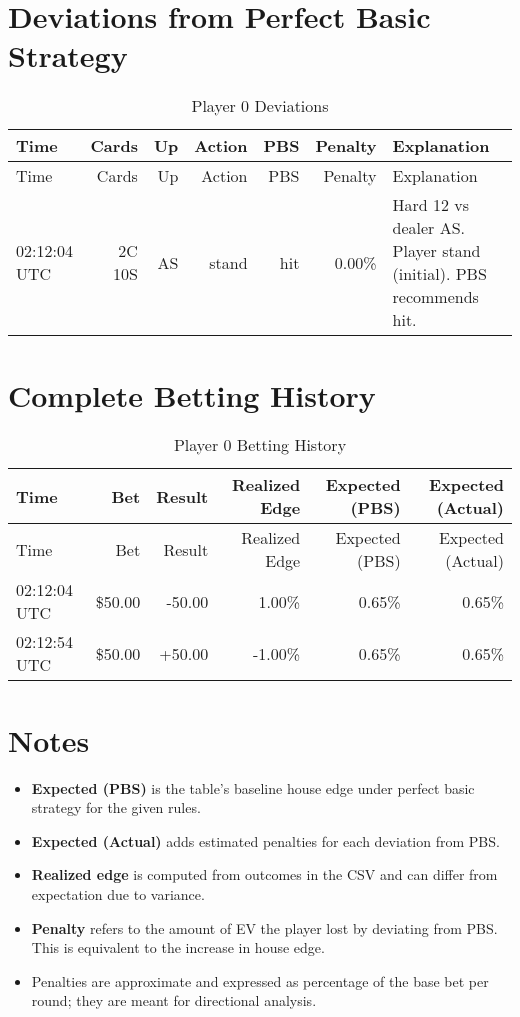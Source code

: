 \documentclass[11pt]{article}
\begin{document}
\section*{Deviations from Perfect Basic Strategy}
\begin{longtable}{l | r | r | r | r | r | p{5cm}}
\caption{Player 0 Deviations}\label{tab:devs_p0}\\
\hline
Time & Cards & Up & Action & PBS & Penalty & Explanation \\ \hline
\endfirsthead
\hline
Time & Cards & Up & Action & PBS & Penalty & Explanation \\ \hline
\endhead
02:12:04 UTC & 2C 10S & AS & stand & hit & 0.00\% & Hard 12 vs dealer AS. Player stand (initial). PBS recommends hit. \\
\hline
\end{longtable}
\section*{Complete Betting History}
\begin{longtable}{l | r | r | r | r | r}
\caption{Player 0 Betting History}\label{tab:history_p0}\\
\hline
Time & Bet & Result & Realized Edge & Expected (PBS) & Expected (Actual) \\ \hline
\endfirsthead
\hline
Time & Bet & Result & Realized Edge & Expected (PBS) & Expected (Actual) \\ \hline
\endhead
02:12:04 UTC & \$50.00 & -50.00 & 1.00\% & 0.65\% & 0.65\% \\
02:12:54 UTC & \$50.00 & +50.00 & -1.00\% & 0.65\% & 0.65\% \\
\hline
\end{longtable}

\section*{Notes}
\begin{itemize}
  \item \textbf{Expected (PBS)} is the table’s baseline house edge under perfect basic strategy for the given rules.
  \item \textbf{Expected (Actual)} adds estimated penalties for each deviation from PBS.
  \item \textbf{Realized edge} is computed from outcomes in the CSV and can differ from expectation due to variance.
  \item \textbf{Penalty} refers to the amount of EV the player lost by deviating from PBS. This is equivalent to the increase in house edge.
  \item Penalties are approximate and expressed as percentage of the base bet per round; they are meant for directional analysis.
\end{itemize}
\end{document}
